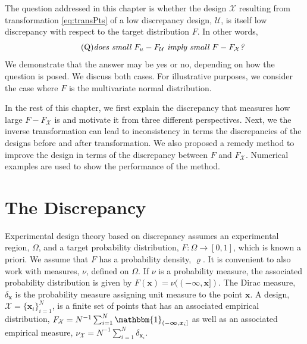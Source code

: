 \documentclass[graybox]{svmult}
\newcommand{\vx}{\boldsymbol{x}}
\newcommand{\vinfty}{\boldsymbol{\infty}}
\newcommand{\Udes}{\mathcal{U}}
\newcommand{\Xdes}{\mathcal{X}}
\newcommand{\Ftar}{F}
\newcommand{\ftar}{\varrho}
\newcommand{\bbone}{\mathbbm{1}}
\begin{document}
The question addressed in this chapter is whether the design $\Xdes$ resulting from transformation \eqref{eq:transPts} of a low discrepancy design, $\Udes$, is itself low discrepancy with respect to the target distribution $\Ftar$. 
In other words, 
\begin{equation} \label{BigQ} \tag{Q}
\text{\emph{does small $F_u - F_\Udes$ imply small $\Ftar - F_\Xdes$?}}
\end{equation}
We demonstrate that the answer may be yes or no, depending on how the question is posed.  
We discuss both cases.  
For illustrative purposes, we consider the case where $\Ftar$ is the multivariate normal distribution.

In the rest of this chapter, we first explain the discrepancy that measures how large $\Ftar - F_\Xdes$ is and motivate it from three different perspectives.  Next, we the inverse transformation can lead to inconsistency in terms the discrepancies of the designs before and after transformation. 
We also proposed a remedy method to improve the design in terms of the discrepancy between $\Ftar$ and $F_\Xdes$. 
Numerical examples are used to show the performance of the method. 

\section{The Discrepancy}

Experimental design theory based on  discrepancy assumes an experimental region, $\Omega$, and a target probability distribution, $\Ftar:\Omega \to [0,1]$, which is known a priori. We assume that $\Ftar$ has a probability density, $\ftar$.  It is convenient to also work with measures, $\nu$, defined on $\Omega$.  If $\nu$ is a probability measure, the associated probability distribution is given by $F(\vx) = \nu((-\vinfty,\vx])$.  The Dirac measure, $\delta_{\vx}$ is the probability measure assigning unit measure to the point $\vx$.  A design, $\Xdes = \{\vx_i\}_{i=1}^N$, is a finite set of points that has an associated empirical distribution, $F_{\Xdes}  = N^{-1} \sum_{i=1}^N \bbone_{(-\vinfty,\vx_i]}$ as well as an associated empirical measure, $\nu_{\Xdes}  = N^{-1} \sum_{i=1}^N \delta_{\vx_i}$.
\end{document}
